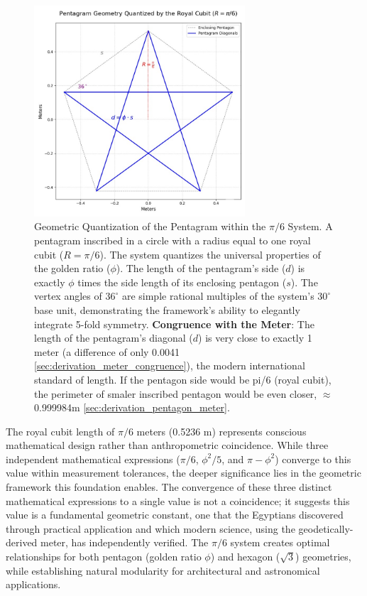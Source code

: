 \documentclass[11pt]{article}
\begin{document}
\begin{figure}[h!]
\centering
\includegraphics[width=0.7\textwidth]{figures/pentagram-fig.jpeg}
\caption{Geometric Quantization of the Pentagram within the $\pi/6$ System. A pentagram inscribed in a circle with a radius equal to one royal cubit ($R = \pi/6$). The system quantizes the universal properties of the golden ratio ($\phi$). The length of the pentagram's side ($d$) is exactly $\phi$ times the side length of its enclosing pentagon ($s$). The vertex angles of $36^\circ$ are simple rational multiples of the system's $30^\circ$ base unit, demonstrating the framework's ability to elegantly integrate 5-fold symmetry. \textbf{Congruence with the Meter}: The length of the pentagram's diagonal ($d$) is very close to exactly 1 meter (a difference of only 0.0041 \ref{sec:derivation_meter_congruence}), the modern international standard of length. If the pentagon side would be pi/6 (royal cubit), the perimeter of smaler inscribed pentagon would be even closer, $\approx$0.999984m \ref{sec:derivation_pentagon_meter}.}
\label{fig:pentagram_quantization}
\end{figure}

The royal cubit length of $\pi/6$ meters (0.5236 m) represents conscious mathematical design rather than anthropometric coincidence. While three independent mathematical expressions ($\pi/6$, $\phi^2/5$, and $\pi - \phi^2$) converge to this value within measurement tolerances, the deeper significance lies in the geometric framework this foundation enables. The convergence of these three distinct mathematical expressions to a single value is not a coincidence; it suggests this value is a fundamental geometric constant, one that the Egyptians discovered through practical application and which modern science, using the geodetically-derived meter, has independently verified. The $\pi/6$ system creates optimal relationships for both pentagon (golden ratio $\phi$) and hexagon ($\sqrt{3}$) geometries, while establishing natural modularity for architectural and astronomical applications.
\end{document}
